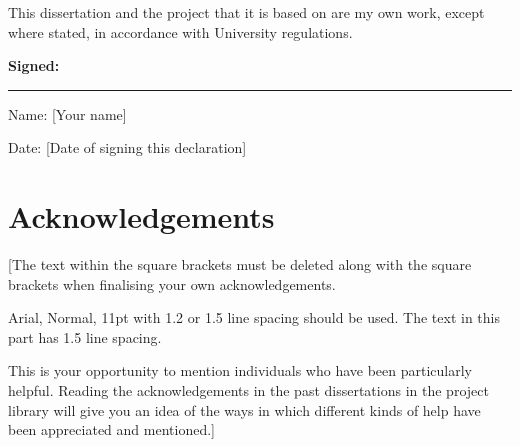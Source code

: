 This dissertation and the project that it is based on are my own work, except where stated, in accordance with University regulations.

\vspace{12pt}
\textbf{Signed:}
\hrule width 0.7\textwidth
\vspace{12pt}

Name: [Your name] 
\vspace{3pt}

Date: [Date of signing this declaration] 



\chapter*{Acknowledgements}
\thispagestyle{fancy} %

[The text within the square brackets must be deleted along with the square brackets when finalising your own acknowledgements. 

Arial, Normal, 11pt with 1.2 or 1.5 line spacing should be used. The text in this part has 1.5 line spacing.

This is your opportunity to mention individuals who have been particularly helpful. Reading the acknowledgements in the past dissertations in the project library will give you an idea of the ways in which different kinds of help have been appreciated and mentioned.]

